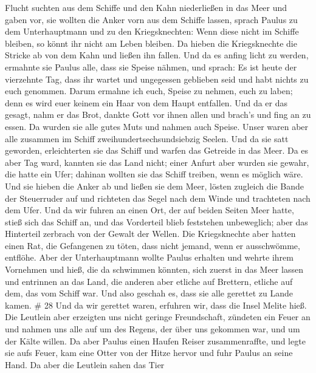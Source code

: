Flucht suchten aus dem Schiffe und den Kahn niederließen in das Meer und
gaben vor, sie wollten die Anker vorn aus dem Schiffe lassen,
 sprach Paulus zu dem Unterhauptmann und zu den
Kriegsknechten: Wenn diese nicht im Schiffe bleiben, so könnt ihr nicht
am Leben bleiben.  Da hieben die Kriegsknechte die Stricke
ab von dem Kahn und ließen ihn fallen.  Und da es anfing
licht zu werden, ermahnte sie Paulus alle, dass sie Speise nähmen, und
sprach: Es ist heute der vierzehnte Tag, dass ihr wartet und ungegessen
geblieben seid und habt nichts zu euch genommen.  Darum
ermahne ich euch, Speise zu nehmen, euch zu laben; denn es wird euer
keinem ein Haar von dem Haupt entfallen.  Und da er das
gesagt, nahm er das Brot, dankte Gott vor ihnen allen und brach's und
fing an zu essen.  Da wurden sie alle gutes Muts und nahmen
auch Speise.  Unser waren aber alle zusammen im Schiff
zweihundertsechsundsiebzig Seelen.  Und da sie satt
geworden, erleichterten sie das Schiff und warfen das Getreide in das
Meer.  Da es aber Tag ward, kannten sie das Land nicht;
einer Anfurt aber wurden sie gewahr, die hatte ein Ufer; dahinan wollten
sie das Schiff treiben, wenn es möglich wäre.  Und sie
hieben die Anker ab und ließen sie dem Meer, lösten zugleich die Bande
der Steuerruder auf und richteten das Segel nach dem Winde und
trachteten nach dem Ufer.  Und da wir fuhren an einen Ort,
der auf beiden Seiten Meer hatte, stieß sich das Schiff an, und das
Vorderteil blieb feststehen unbeweglich; aber das Hinterteil zerbrach
von der Gewalt der Wellen.  Die Kriegsknechte aber hatten
einen Rat, die Gefangenen zu töten, dass nicht jemand, wenn er
ausschwömme, entflöhe.  Aber der Unterhauptmann wollte
Paulus erhalten und wehrte ihrem Vornehmen und hieß, die da schwimmen
könnten, sich zuerst in das Meer lassen und entrinnen an das Land,
 die anderen aber etliche auf Brettern, etliche auf dem,
das vom Schiff war. Und also geschah es, dass sie alle gerettet zu Lande
kamen. \# 28  Und da wir gerettet waren, erfuhren wir, dass
die Insel Melite hieß.  Die Leutlein aber erzeigten uns
nicht geringe Freundschaft, zündeten ein Feuer an und nahmen uns alle
auf um des Regens, der über uns gekommen war, und um der Kälte willen.
 Da aber Paulus einen Haufen Reiser zusammenraffte, und
legte sie aufs Feuer, kam eine Otter von der Hitze hervor und fuhr
Paulus an seine Hand.  Da aber die Leutlein sahen das Tier
